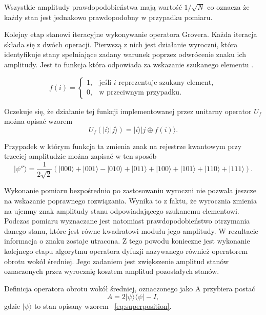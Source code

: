 \noindent
Wszystkie amplitudy prawdopodobieństwa mają wartość $1/\sqrt{N}$ co oznacza że każdy stan jest jednakowo prawdopodobny w przypadku pomiaru.
\newpage

Kolejny etap stanowi iteracyjne wykonywanie operatora Grovera. Każda iteracja składa się z dwóch operacji. Pierwszą z nich jest działanie wyroczni, która identyfikuje stany spełniające zadany warunek poprzez odwrócenie znaku ich amplitudy. Jest to funkcja która odpowiada za wskazanie szukanego elementu \cite[s.~162, wz.~(4.67)]{inf_kwant}.

\begin{equation}
\label{eq:oracle}
f(i)=\begin{cases}
1,& \text{jeśli } i \text{ reprezentuje szukany element},\\
0,& \text{w przeciwnym przypadku.}
\end{cases}
\end{equation}

\noindent
Oczekuje się, że działanie tej funkcji implementowanej przez unitarny operator $U_f$ można opisać wzorem \cite[s.~162, wz.~(4.68)]{inf_kwant}   
\begin{equation}
\label{eq:oracle_quantum}
U_f(|i\rangle|j\rangle)=|i\rangle|j\oplus f(i)\rangle.
\end{equation}

\noindent
Przypadek w którym funkcja ta zmienia znak na rejestrze kwantowym przy trzeciej amplitudzie można zapisać w ten sposób \cite[s~278, wz.~(5.367)]{inf_kwant}  
\begin{equation}
\label{eq:oracle_example}
|\psi''\rangle = \frac1{2\sqrt2} ( |000\rangle+ |001\rangle- |010\rangle+ |011\rangle+ |100\rangle+ |101\rangle+ |110\rangle+ |111\rangle ).
\end{equation}

Wykonanie pomiaru bezpośrednio po zastosowaniu wyroczni nie pozwala jeszcze na wskazanie poprawnego rozwiązania. Wynika to z faktu, że wyrocznia zmienia na ujemny znak amplitudy stanu odpowiadającego szukanemu elementowi. Podczas pomiaru wyznaczane jest natomiast prawdopodobieństwo otrzymania danego stanu, które jest równe kwadratowi modułu jego amplitudy. W rezultacie informacja o znaku zostaje utracona. Z tego powodu konieczne jest wykonanie kolejnego etapu algorytmu operatora dyfuzji nazywanego również operatorem obrotu wokół średniej. Jego zadaniem jest zwiększenie amplitud stanów oznaczonych przez wyrocznię kosztem amplitud pozostałych stanów.

Definicja operatora obrotu wokół średniej, oznaczonego jako A przybiera postać \cite[s.~163, wz.~(4.71)]{inf_kwant}   
\begin{equation}
\label{eq:diffusion_operator}
A=2|\psi\rangle\langle\psi|-I,
\end{equation}
\noindent
gdzie $|\psi\rangle$ to stan opisany wzorem ~\eqref{eq:superposition}.


